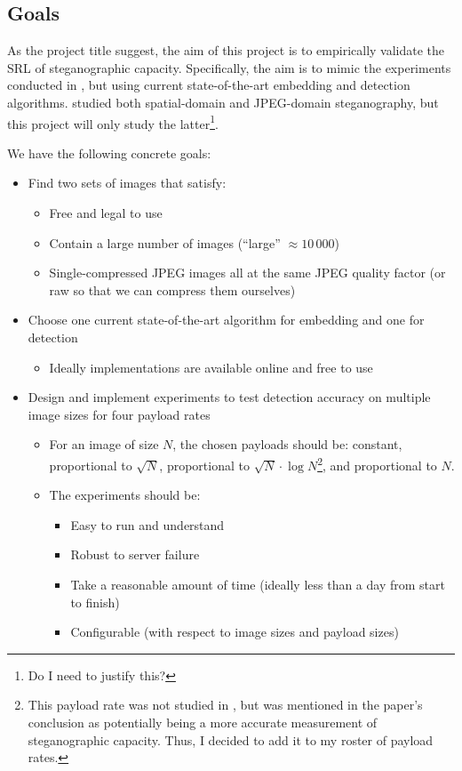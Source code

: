 \documentclass[11pt,a4paper,twoside,openright]{report}
\begin{document}
\subsection{Goals} \label{sec:goals}

As the project title suggest, the aim of this project is to empirically validate the SRL of steganographic capacity. Specifically, the aim is to mimic the experiments conducted in \cite{2008-paper}, but using current state-of-the-art embedding and detection algorithms. \cite{2008-paper} studied both spatial-domain and JPEG-domain steganography, but this project will only study the latter\footnote{Do I need to justify this?}.

We have the following concrete goals:
\begin{itemize}

	\item Find two sets of images that satisfy:
		\begin{itemize}
			\item Free and legal to use
			\item Contain a large number of images (``large'' $\approx 10\,000$)
			\item Single-compressed JPEG images all at the same JPEG quality factor (or raw so that we can compress them ourselves)
		\end{itemize}

	\item Choose one current state-of-the-art algorithm for embedding and one for detection
		\begin{itemize}
			\item Ideally implementations are available online and free to use
		\end{itemize}

	\item Design and implement experiments to test detection accuracy on multiple image sizes for four payload rates
		\begin{itemize}
			\item For an image of size $N$, the chosen payloads should be: constant, proportional to $\sqrt{N}$, proportional to $\sqrt{N}\cdot\log{N}$\footnote{This payload rate was not studied in \cite{2008-paper}, but was mentioned in the paper's conclusion as potentially being a more accurate measurement of steganographic capacity. Thus, I decided to add it to my roster of payload rates.}, and proportional to $N$.
			\item The experiments should be:
				\begin{itemize}
					\item Easy to run and understand
					\item Robust to server failure
					\item Take a reasonable amount of time (ideally less than a day from start to finish) 
					\item Configurable (with respect to image sizes and payload sizes)
				\end{itemize}
		\end{itemize}


\end{itemize}
\end{document}
